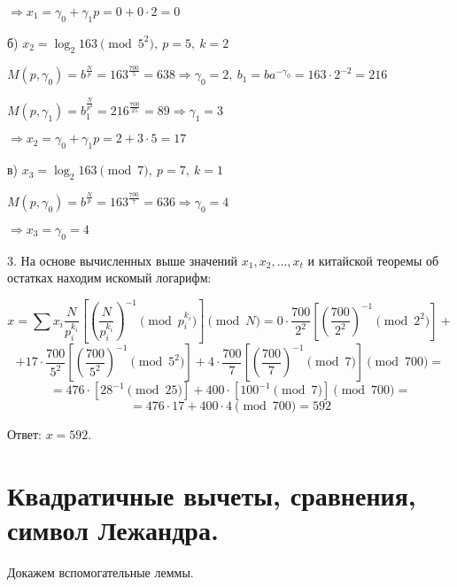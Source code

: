 \documentclass[a4paper,11pt,openany]{book}
\begin{document}
\noindent $\Rightarrow x_1 = \gamma_0 + \gamma_1 p = 0 + 0 \cdot 2 = 0$

б) $x_2 = \log_2 163 \pmod { 5^2 }, \ p = 5, \ k = 2$

\noindent $M(p, \gamma_0) = b ^ { \frac{N}{p} } = 163 ^ { \frac{700}{5} } = 638 \Rightarrow \gamma_0 = 2, \ b_1 = ba^{-\gamma_0} = 163 \cdot 2 ^ {-2} = 216$

\noindent $M(p, \gamma_1) = b_1 ^ { \frac{N}{p^2} } = 216 ^ { \frac{700}{25} } = 89 \Rightarrow \gamma_1 = 3$

\noindent $\Rightarrow x_2 = \gamma_0 + \gamma_1 p = 2 + 3 \cdot 5 = 17$

в) $x_3 = \log_2 163 \pmod { 7 }, \ p = 7, \ k = 1$

\noindent $M(p, \gamma_0) = b ^ { \frac{N}{p} } = 163 ^ { \frac{700}{7} } = 636 \Rightarrow \gamma_0 = 4$

\noindent $\Rightarrow x_3 = \gamma_0 = 4$

3. На основе вычисленных выше значений $x_1, x_2, ..., x_t$ и китайской теоремы об остатках находим искомый логарифм:

$$x = \sum x_i \frac{N}{p_i^{k_i}} [ ( \frac{N}{p_i^{k_i}} ) ^ {-1} \!\!\!\!\pmod {p_i^{k_i}} ] \!\!\!\!\pmod N = 0 \cdot \frac{700}{2^2} [ (\frac{700}{2^2}) ^ {-1} \!\!\!\!\pmod {2^2}] + $$ 
$$+ 17 \cdot \frac{700}{5^2} [ (\frac{700}{5^2}) ^ {-1} \!\!\!\!\pmod {5^2}] + 4 \cdot \frac{700}{7} [ (\frac{700}{7}) ^ {-1} \!\!\!\!\pmod 7]  \pmod {700} = $$
$$ = 476 \cdot [ 28 ^ {-1} \!\!\!\!\pmod {25}] + 400 \cdot [100 ^ {-1} \!\!\!\!\pmod 7] \pmod {700} = $$
$$ = 476 \cdot 17 + 400 \cdot 4 \pmod {700} = 592$$

\noindent Ответ: $x = 592$.

%
%
%
%
%
%
%
%
%
%
%
%

\section{Квадратичные вычеты, сравнения, символ Лежандра.}

Докажем вспомогательные леммы.

\end{document}
